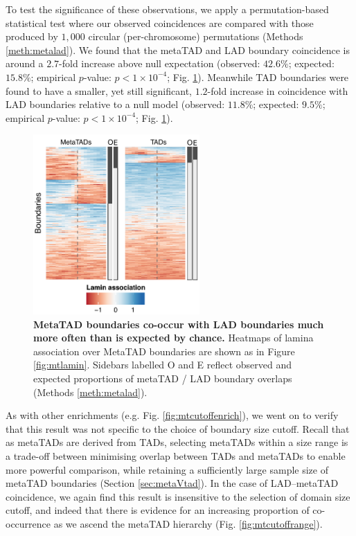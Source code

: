 \documentclass[a4paper,11pt,oneside]{book}
\begin{document}
To test the significance of these observations, we apply a permutation-based statistical test where our observed coincidences are compared with those produced by $1,000$ circular (per-chromosome) permutations (Methods \ref{meth:metalad}). We found that the metaTAD and LAD boundary coincidence is around a $2.7$-fold increase above null expectation (observed: $42.6\%$; expected: $15.8\%$; empirical $p$-value: $p < 1 \times 10^{-4}$; Fig. \ref{fig:mtsummary}). Meanwhile TAD boundaries were found to have a smaller, yet still significant, $1.2$-fold increase in coincidence with LAD boundaries relative to a null model (observed: $11.8\%$; expected: $9.5\%$; empirical $p$-value: $p < 1 \times 10^{-4}$; Fig. \ref{fig:mtsummary}).

\begin{figure}
\begin{center} 
\includegraphics[width=2.5in]{mt_laminsummary.pdf}
\captionsetup{width=\textwidth}
\caption[ MetaTAD boundaries co-occur with LAD boundaries much more often than is expected by chance. ]{ {\bf MetaTAD boundaries co-occur with LAD boundaries much more often than is expected by chance. }
Heatmaps of lamina association over MetaTAD boundaries are shown as in Figure \ref{fig:mtlamin}. Sidebars labelled O and E reflect observed and expected proportions of metaTAD / LAD boundary overlaps (Methods \ref{meth:metalad}).
}\label{fig:mtsummary}
\end{center}
\end{figure} 

As with other enrichments (e.g. Fig. \ref{fig:mtcutoffenrich}), we went on to verify that this result was not specific to the choice of boundary size cutoff. Recall that as metaTADs are derived from TADs, selecting metaTADs within a size range is a trade-off between minimising overlap between TADs and metaTADs to enable more powerful comparison, while retaining a sufficiently large sample size of metaTAD boundaries (Section \ref{sec:metaVtad}). In the case of LAD--metaTAD coincidence, we again find this result is insensitive to the selection of domain size cutoff, and indeed that there is evidence for an increasing proportion of co-occurrence as we ascend the metaTAD hierarchy (Fig. \ref{fig:mtcutoffrange}).
\end{document}
